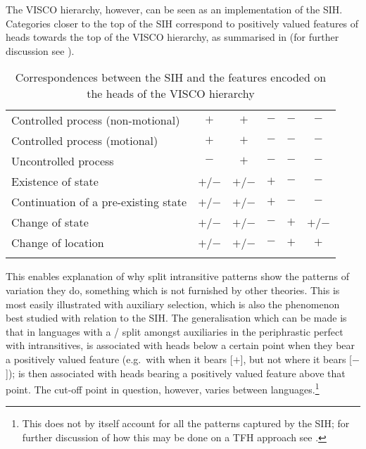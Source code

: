 \documentclass[output=paper]{langsci/langscibook}
\begin{document}
The VISCO hierarchy, however, can be seen as an implementation of the SIH\@.
Categories closer to the top of the \gls{SIH} correspond to positively valued
features of heads towards the top of the VISCO hierarchy, as summarised in
 (for further discussion see \citealt{Baker2019}).

\begin{table}
\begin{tabularx}{\textwidth}{Qccccc}
\lsptoprule
&  &  &  &  & \\\midrule
Controlled process (non-motional) & $+$ & $+$ & $-$ & $-$ & $-$\\
Controlled process (motional) & $+$ & $+$ & $-$ & $-$ & $-$\\
Uncontrolled process & $-$ & $+$ & $-$ & $-$ & $-$\\
Existence of state & $+$/$-$ & $+$/$-$ & $+$ & $-$ & $-$\\
Continuation of a pre-existing state & $+$/$-$ & $+$/$-$ & $+$ & $-$ & $-$\\
Change of state & $+$/$-$ & $+$/$-$ & $-$ & $+$ & $+$/$-$\\
Change of location & $+$/$-$ & $+$/$-$ & $-$ & $+$ & $+$\\
\lspbottomrule
\end{tabularx}
\caption{Correspondences between the \gls{SIH} and the features encoded on the heads
    of the VISCO hierarchy}\label{tab:key:19.3}
\end{table}

This enables explanation of why split intransitive patterns show the patterns
of variation they do, something which is not furnished by other theories. This
is most easily illustrated with auxiliary selection, which is
also the phenomenon best studied with relation to the SIH\@. The generalisation
which can be made is that in languages with a \HAVE\slash\BE{} split amongst auxiliaries
in the periphrastic perfect with intransitives, \BE{} is associated with heads
below a certain point when they bear a positively valued feature (e.g.\ with
\Oriented{} when it bears [$+$\Oriented{}], but not where it bears [$-$\Oriented{}]);
\HAVE{} is then associated with heads bearing a positively valued feature above
that point. The cut-off point in question, however, varies between
languages.\footnote{This does not by itself account for all the patterns
captured by the \gls{SIH}; for further discussion of how this may be done on a
TFH approach see \citet{Baker2018}.}
\end{document}
